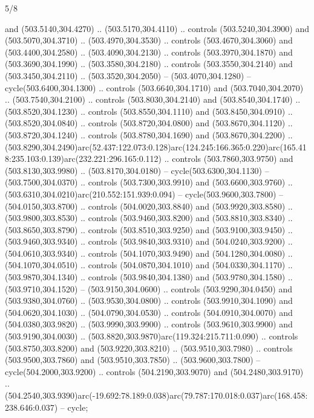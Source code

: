 \begin{flagdescription}{5/8}
\begin{scope}[xshift=0.5\flaglength,yshift=0.5\flagwidth,scale=\flagwidth/475.63]
\begin{scope}[y=0.8pt, x=0.8pt, yscale=-1, xscale=1,shift={(-450,-300)}]
\begin{scope}[cm={{1.0,0.0,0.0,1.0,(-0.0002,0.12556)}},cm={{1.0,0.0,0.0,1.0,(0.00179,0.0)}}]
\begin{scope}[cm={{1.11592,0.0,0.0,1.11592,(-106.89933,-41.77764)}}]
\begin{scope}[draw=black,fill=cfff]
\begin{scope}[fill=black]
  and (503.5140,304.4270) .. (503.5170,304.4110) .. controls (503.5240,304.3900)
  and (503.5070,304.3710) .. (503.4970,304.3530) .. controls (503.4670,304.3060)
  and (503.4400,304.2580) .. (503.4090,304.2130) .. controls (503.3970,304.1870)
  and (503.3690,304.1990) .. (503.3580,304.2180) .. controls (503.3550,304.2140)
  and (503.3450,304.2110) .. (503.3520,304.2050) -- (503.4070,304.1280) --
  cycle(503.6400,304.1300) .. controls (503.6640,304.1710) and
  (503.7040,304.2070) .. (503.7540,304.2100) .. controls (503.8030,304.2140) and
  (503.8540,304.1740) .. (503.8520,304.1230) .. controls (503.8550,304.1110) and
  (503.8450,304.0910) .. (503.8520,304.0840) .. controls (503.8720,304.0800) and
  (503.8670,304.1120) .. (503.8720,304.1240) .. controls (503.8780,304.1690) and
  (503.8670,304.2200) ..
  (503.8290,304.2490)arc(52.437:122.073:0.128)arc(124.245:166.365:0.220)arc(165.418:235.103:0.139)arc(232.221:296.165:0.112)
  .. controls (503.7860,303.9750) and (503.8130,303.9980) .. (503.8170,304.0180)
  -- cycle(503.6300,304.1130) -- (503.7500,304.0370) .. controls
  (503.7300,303.9910) and (503.6600,303.9760) ..
  (503.6310,304.0210)arc(210.552:151.939:0.094) -- cycle(503.9600,303.7800) --
  (504.0150,303.8700) .. controls (504.0020,303.8840) and (503.9920,303.8580) ..
  (503.9800,303.8530) .. controls (503.9460,303.8200) and (503.8810,303.8340) ..
  (503.8650,303.8790) .. controls (503.8510,303.9250) and (503.9100,303.9450) ..
  (503.9460,303.9340) .. controls (503.9840,303.9310) and (504.0240,303.9200) ..
  (504.0610,303.9340) .. controls (504.1070,303.9490) and (504.1280,304.0080) ..
  (504.1070,304.0510) .. controls (504.0870,304.1010) and (504.0330,304.1170) ..
  (503.9870,304.1340) .. controls (503.9840,304.1380) and (503.9780,304.1580) ..
  (503.9710,304.1520) -- (503.9150,304.0600) .. controls (503.9290,304.0450) and
  (503.9380,304.0760) .. (503.9530,304.0800) .. controls (503.9910,304.1090) and
  (504.0620,304.1030) .. (504.0790,304.0530) .. controls (504.0910,304.0070) and
  (504.0380,303.9820) .. (503.9990,303.9900) .. controls (503.9610,303.9900) and
  (503.9190,304.0030) .. (503.8820,303.9870)arc(119.324:215.711:0.090) ..
  controls (503.8750,303.8200) and (503.9220,303.8210) .. (503.9510,303.7980) ..
  controls (503.9500,303.7860) and (503.9510,303.7850) .. (503.9600,303.7800) --
  cycle(504.2000,303.9200) .. controls (504.2190,303.9070) and
  (504.2480,303.9170) ..
  (504.2540,303.9390)arc(-19.692:78.189:0.038)arc(79.787:170.018:0.037)arc(168.458:238.646:0.037)
  -- cycle;
\end{scope}
\end{scope}
\end{scope}
\end{scope}
\end{scope}
\end{scope}
\fi
\framecode{}
\end{flagdescription}

